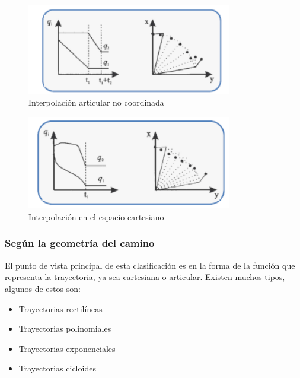            \begin{figure}[htb]
             \centering
             \label{f:cap4_tray_4a}
                \includegraphics[width=0.8\textwidth]{Main/Chapter4/Images4/cap4_tray_4a.png}
             \caption{Interpolación articular no coordinada \cite{tray_utec}}
        \end{figure}            


           \begin{figure}[htb]
             \centering
             \label{f:cap4_tray_4b}
                \includegraphics[width=0.8\textwidth]{Main/Chapter4/Images4/cap4_tray_4b.png}
             \caption{Interpolación en el espacio cartesiano \cite{tray_utec}}
        \end{figure}         
            
            
         \newpage   
        
        \subsubsection{Según la geometría del camino }
            El punto de vista principal de esta clasificación es en la forma de la función que representa la trayectoria, ya sea cartesiana o articular. Existen muchos tipos, algunos de estos son:
            \begin{itemize}
                \item         Trayectorias rectilíneas
                \item        Trayectorias polinomiales
                \item        Trayectorias exponenciales
                \item        Trayectorias cicloides
            \end{itemize}
                
